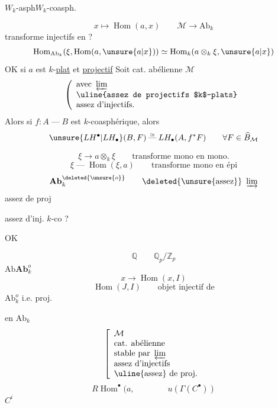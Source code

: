 $W_k$-asph\qquad $W_k$-coasph.

\[
x\longmapsto\operatorname{Hom}(a,x)\qquad\mathcal M\longrightarrow\mathrm{Ab}_k
\]
transforme injectifs en  ?
\[
\operatorname{Hom}_{\mathrm{Ab}_k}(\xi,\operatorname{Hom}(a,\unsure{a|x}))
\simeq\operatorname{Hom}_k(a\otimes_k\xi,\unsure{a|x})
\]
OK si $a$ est $k$-\uline{plat} et \uline{projectif}
Soit cat. abélienne $\mathcal M$
\[
\left(\begin{array}{l}
\text{avec }\varprojlim\\
\text{\uline{assez de projectifs $k$-plats}}\\
\text{assez d'injectifs.}
\end{array}\right.
\]
Alors si $f:A\mathbin{\text{---}}B$ est $k$-coasphérique, alors
\[
\unsure{LH^\bullet|LH_\bullet}(B,F)\overset{\simeq}{\mathbin{\text{---}}}LH_\bullet(A,f^*F)
\qquad\forall F\in\widehat B_{\mathcal M}
\]

\[
\xi\longrightarrow a\otimes_k\xi\qquad\text{transforme mono en mono.}
\]
\margin{$)$}
\[
\xi\mathbin{\text{---}}\operatorname{Hom}(\xi,a)\qquad\text{transforme mono en épi}
\]
\[
\mathbf{Ab}_k^{\deleted{\unsure{o}}}\qquad
\deleted{\text{\unsure{assez}}}\ \varinjlim
\]
assez de proj

assez d'inj. $k$-co ?

OK

\deleted{$\varinjlim$}
\[
\mathbb Q\qquad\mathbb Q_p/\mathbb Z_p
\]
$\mathrm{Ab}$\hfill$\mathbf{Ab}_k^o$
\[
x\longrightarrow\operatorname{Hom}(x,I)
\]
\[
\operatorname{Hom}(J,I)\qquad\text{objet injectif de}
\]
$\mathrm{Ab}_k^o$ i.e. proj.\par
en $\mathrm{Ab}_k$
\[
\left[\begin{array}{l}
\mathcal M\\
\text{cat. abélienne}\\
\text{stable par }\varprojlim\\
\text{assez d'injectifs}\\
\text{\uline{assez} de proj.}
\end{array}\right.
\]
\[
R\operatorname{Hom}^{\bullet}(a,\qquad\qquad u(\Gamma(C^\bullet))
\]
$C^i$

